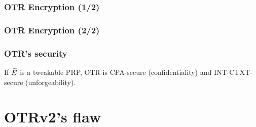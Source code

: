 \documentclass{beamer}
\begin{document}
	

	\begin{frame}
		\frametitle{OTR Encryption (1/2)}
				\begin{center}
					\begin{tikzpicture}[
						scale=1,
						node distance=1.8cm,
						line width = 0.5pt,
					]
						
					\end{tikzpicture}
				\end{center}		
	\end{frame}

	\begin{frame}
		\frametitle{OTR Encryption (2/2)}
				\begin{center}

						
				\end{center}		
	\end{frame}


	\begin{frame}
		\frametitle{OTR's security}
		\begin{theorem}[{Theorem 3 of [Min14]}]
			If $\tE$ is a tweakable PRP, OTR is CPA-secure (confidentiality) and INT-CTXT-secure (unforgeability).
		\end{theorem}

	\end{frame}

	

\section{OTRv2's flaw} %
\label{sec:otrv2_s_flaw}
\end{document}
